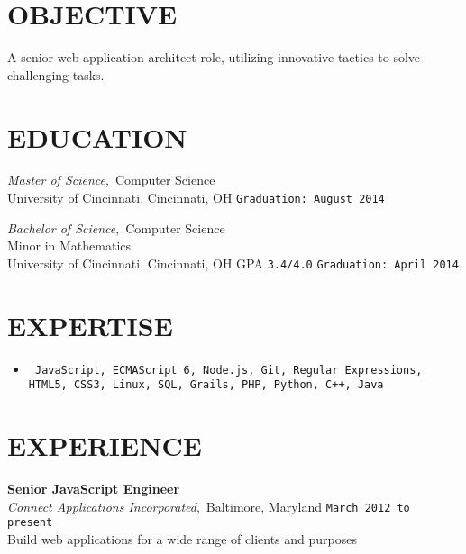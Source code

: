\documentclass[11pt, line]{res}
\begin{document}
	\address{8228 Melrose Ln\\ Maineville, OH 45039\\ 513-259-0656\\ ross@rhadden.com}

	\begin{resume}
		\vspace{-16pt}
		\section{OBJECTIVE}
			A senior web application architect role, utilizing innovative tactics to solve challenging tasks.

		\section{EDUCATION}
				\textit{Master of Science},\, Computer Science \\
				University of Cincinnati, Cincinnati, OH
					\hfill \texttt{Graduation: August 2014}

			\vspace{-2pt}
				\textit{Bachelor of Science},\, Computer Science \\
				Minor in Mathematics \\
				University of Cincinnati, Cincinnati, OH
					\hspace{16pt} GPA \texttt{3.4/4.0}
					\hfill \texttt{Graduation: April 2014}

		\section{EXPERTISE}
			\begin{itemize}[leftmargin=0pt]
				\item[]
				\texttt{
					JavaScript,
					ECMAScript 6,
					Node.js,
					Git,
					Regular Expressions,
					HTML5,
					CSS3,
					Linux,
					SQL,
					Grails,
					PHP,
					Python,
					C++,
					Java
				}
			\end{itemize}

		\section{EXPERIENCE}
				\textbf{Senior JavaScript Engineer} \\
				\textit{Connect Applications Incorporated},\, Baltimore, Maryland
					\hfill \texttt{March 2012 to present} \\
				Build web applications for a wide range of clients and purposes


\end{resume}
\end{document}
